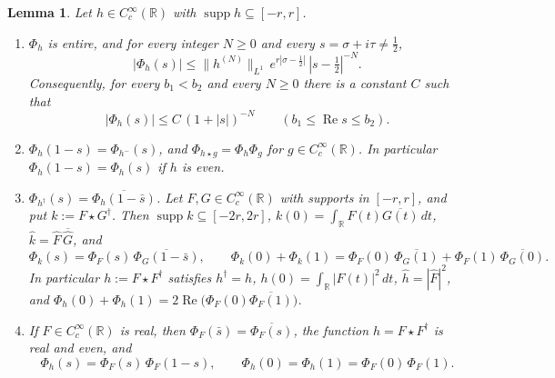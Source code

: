 \documentclass[11pt]{amsart}
\newtheorem{lemma}[theorem]{Lemma}
\theoremstyle{remark}
\numberwithin{equation}{section}
\newcommand{\R}{\mathbb R}
\newcommand{\Rel}{\operatorname{Re}}
\newcommand{\supp}{\operatorname{supp}}
\begin{document}
\begin{lemma}
\label{lem:testfn}
Let $h\in C_c^\infty(\R)$ with $\supp h\subseteq[-r,r]$.
\begin{enumerate}
\item[(i)] $\Phi_h$ is entire, and for every integer $N\ge0$ and every
$s=\sigma+i\tau\ne\tfrac12$,
\begin{equation}
\label{eq:Phibound}
  |\Phi_h(s)|\le\|h^{(N)}\|_{L^1}\,e^{r|\sigma-\frac12|}\,|s-\tfrac12|^{-N} .
\end{equation}
Consequently, for every $b_1<b_2$ and every $N\ge0$ there is a constant $C$
such that
\begin{equation}
\label{eq:Phidecay}
  |\Phi_h(s)|\le C\,(1+|s|)^{-N}\qquad(b_1\le\Rel s\le b_2).
\end{equation}
\item[(ii)] $\Phi_h(1-s)=\Phi_{h^-}(s)$, and $\Phi_{h\star g}=\Phi_h\Phi_g$
for $g\in C_c^\infty(\R)$.  In particular $\Phi_h(1-s)=\Phi_h(s)$ if $h$ is
even.
\item[(iii)] $\Phi_{h^\dagger}(s)=\overline{\Phi_h(1-\bar s)}$.  Let
$F,G\in C_c^\infty(\R)$ with supports in $[-r,r]$, and put
$k:=F\star G^\dagger$.  Then $\supp k\subseteq[-2r,2r]$,
$k(0)=\int_\R F(t)\overline{G(t)}\,dt$,
$\hat k=\hat F\,\overline{\hat G}$, and
\[
  \Phi_k(s)=\Phi_F(s)\,\overline{\Phi_G(1-\bar s)},\qquad
  \Phi_k(0)+\Phi_k(1)=\Phi_F(0)\,\overline{\Phi_G(1)}
     +\Phi_F(1)\,\overline{\Phi_G(0)} .
\]
In particular $h:=F\star F^\dagger$ satisfies $h^\dagger=h$,
$h(0)=\int_\R|F(t)|^2\,dt$, $\hat h=|\hat F|^2$, and
$\Phi_h(0)+\Phi_h(1)=2\Rel\bigl(\Phi_F(0)\overline{\Phi_F(1)}\bigr)$.
\item[(iv)] If $F\in C_c^\infty(\R)$ is real, then
$\Phi_F(\bar s)=\overline{\Phi_F(s)}$, the function $h=F\star F^\dagger$ is
real and even, and
\[
  \Phi_h(s)=\Phi_F(s)\,\Phi_F(1-s),\qquad
  \Phi_h(0)=\Phi_h(1)=\Phi_F(0)\,\Phi_F(1).
\]
\end{enumerate}
\end{lemma}
\end{document}
